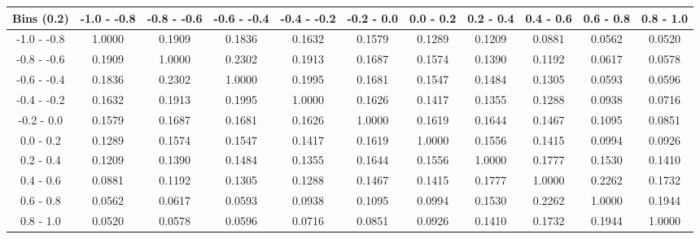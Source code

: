 \documentclass[aps, prd, reprint,showpacs,  preprintnumbers,amsmath,amssymb,superscriptaddress, nofootinbib]{revtex4-1}
\makeatletter
\renewenvironment{table}
  {\def\@captype{table}}
  {}
\makeatother
\begin{document}
\begin{table}
\begin{tabular}{ccccccccccc}
\hline
    Bins (0.2) &  -1.0 - -0.8 &  -0.8 - -0.6 &  -0.6 - -0.4 &  -0.4 - -0.2 &   -0.2 - 0.0 &    0.0 - 0.2 &    0.2 - 0.4 &    0.4 - 0.6 &    0.6 - 0.8 &    0.8 - 1.0 \\ 
\hline
 -1.0 - -0.8  & 1.0000  & 0.1909  & 0.1836  & 0.1632  & 0.1579  & 0.1289  & 0.1209  & 0.0881  & 0.0562  & 0.0520 \\
 -0.8 - -0.6  & 0.1909  & 1.0000  & 0.2302  & 0.1913  & 0.1687  & 0.1574  & 0.1390  & 0.1192  & 0.0617  & 0.0578 \\
 -0.6 - -0.4  & 0.1836  & 0.2302  & 1.0000  & 0.1995  & 0.1681  & 0.1547  & 0.1484  & 0.1305  & 0.0593  & 0.0596 \\
 -0.4 - -0.2  & 0.1632  & 0.1913  & 0.1995  & 1.0000  & 0.1626  & 0.1417  & 0.1355  & 0.1288  & 0.0938  & 0.0716 \\
 -0.2 -  0.0  & 0.1579  & 0.1687  & 0.1681  & 0.1626  & 1.0000  & 0.1619  & 0.1644  & 0.1467  & 0.1095  & 0.0851 \\
  0.0 -  0.2  & 0.1289  & 0.1574  & 0.1547  & 0.1417  & 0.1619  & 1.0000  & 0.1556  & 0.1415  & 0.0994  & 0.0926 \\
  0.2 -  0.4  & 0.1209  & 0.1390  & 0.1484  & 0.1355  & 0.1644  & 0.1556  & 1.0000  & 0.1777  & 0.1530  & 0.1410 \\
  0.4 -  0.6  & 0.0881  & 0.1192  & 0.1305  & 0.1288  & 0.1467  & 0.1415  & 0.1777  & 1.0000  & 0.2262  & 0.1732 \\
  0.6 -  0.8  & 0.0562  & 0.0617  & 0.0593  & 0.0938  & 0.1095  & 0.0994  & 0.1530  & 0.2262  & 1.0000  & 0.1944 \\
  0.8 -  1.0  & 0.0520  & 0.0578  & 0.0596  & 0.0716  & 0.0851  & 0.0926  & 0.1410  & 0.1732  & 0.1944  & 1.0000 \\
\hline
\end{tabular}
\caption{Correlation matrix for bins of $d\sigma/d\cos(\theta)$.\\
NOTE: Result is for the $\Delta$-enriched subsample with $T_{p}>100$\,MeV and $W<1.4$\,GeV.}

\label{tb:piz-zenith-cov}
\end{table}

\vspace{01.0cm}
\end{document}
